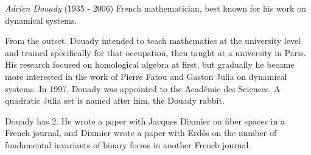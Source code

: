 \documentclass[12pt]{article}
\begin{document}

\emph{Adrien Douady} (1935 - 2006) French mathematician, best known for his work on dynamical systems.

From the outset, Douady intended to teach mathematics at the university level and trained specifically for that occupation, then taught at a university in Paris. His research focused on homological algebra at first, but gradually he became more interested in the work of Pierre Fatou and Gaston Julia on dynamical systems. In 1997, Douady was appointed to the Acad\'emie des Sciences. A quadratic Julia set is named after him, the Douady rabbit.

Douady has  2.  He wrote a paper with Jacques Dixmier on fiber spaces in a French journal, and Dixmier wrote a paper with Erd\H{o}s on the number of fundamental invariants of binary forms in another French journal.
\end{document}
